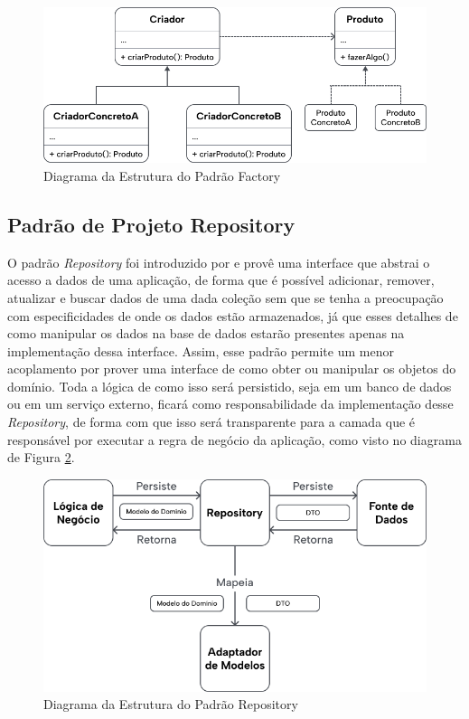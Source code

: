 \documentclass[12pt, %
openright, 
oneside, %
a4paper,    %
brazil]{facom-ufu-abntex2}
\begin{document}
\begin{figure}[ht]
    \centering
    \includegraphics[width=.65\textwidth]{figures/bibliographical_review/factory_diagram.png}
    \caption{Diagrama da Estrutura do Padrão Factory}
    \label{fig:factory_diagram}
\end{figure}

\subsection{Padrão de Projeto Repository}
O padrão \textit{Repository} foi introduzido por  e provê uma interface que abstrai o acesso a dados de uma aplicação, de forma que é possível adicionar, remover, atualizar e buscar dados de uma dada coleção sem que se tenha a preocupação com especificidades de onde os dados estão armazenados, já que esses detalhes de como manipular os dados na base de dados estarão presentes apenas na implementação dessa interface. Assim, esse padrão permite um menor acoplamento por prover uma interface de como obter ou manipular os objetos do domínio. Toda a lógica de como isso será persistido, seja em um banco de dados ou em um serviço externo, ficará como responsabilidade da implementação desse \textit{Repository}, de forma com que isso será transparente para a camada que é responsável por executar a regra de negócio da aplicação, como visto no diagrama de Figura \ref{fig:repository_diagram}.

\begin{figure}[ht]
    \centering
    \includegraphics[width=.65\textwidth]{figures/bibliographical_review/repository_diagram.png}
    \caption{Diagrama da Estrutura do Padrão Repository}
    \label{fig:repository_diagram}
\end{figure}
\end{document}

